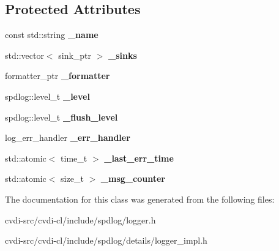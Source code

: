 \subsection*{Protected Attributes}
\begin{DoxyCompactItemize}
\item 
const std\+::string {\bfseries \+\_\+name}\hypertarget{classspdlog_1_1logger_a819e97be3b6e2066edb7798c04121749}{}\label{classspdlog_1_1logger_a819e97be3b6e2066edb7798c04121749}

\item 
std\+::vector$<$ sink\+\_\+ptr $>$ {\bfseries \+\_\+sinks}\hypertarget{classspdlog_1_1logger_aa3563923d7afee42f8ae19e5b1a6daea}{}\label{classspdlog_1_1logger_aa3563923d7afee42f8ae19e5b1a6daea}

\item 
formatter\+\_\+ptr {\bfseries \+\_\+formatter}\hypertarget{classspdlog_1_1logger_af3d364c4242d9071f9f7d48e437c373f}{}\label{classspdlog_1_1logger_af3d364c4242d9071f9f7d48e437c373f}

\item 
spdlog\+::level\+\_\+t {\bfseries \+\_\+level}\hypertarget{classspdlog_1_1logger_a89f596c2328f2ce5402c77eb8b181ab6}{}\label{classspdlog_1_1logger_a89f596c2328f2ce5402c77eb8b181ab6}

\item 
spdlog\+::level\+\_\+t {\bfseries \+\_\+flush\+\_\+level}\hypertarget{classspdlog_1_1logger_a53dcc290a397bd019756cfedf4d839d2}{}\label{classspdlog_1_1logger_a53dcc290a397bd019756cfedf4d839d2}

\item 
log\+\_\+err\+\_\+handler {\bfseries \+\_\+err\+\_\+handler}\hypertarget{classspdlog_1_1logger_a249eaef178568d6f7153e33118f8a9da}{}\label{classspdlog_1_1logger_a249eaef178568d6f7153e33118f8a9da}

\item 
std\+::atomic$<$ time\+\_\+t $>$ {\bfseries \+\_\+last\+\_\+err\+\_\+time}\hypertarget{classspdlog_1_1logger_a0b88740c53e5fc64ebebdbbd1640a4a6}{}\label{classspdlog_1_1logger_a0b88740c53e5fc64ebebdbbd1640a4a6}

\item 
std\+::atomic$<$ size\+\_\+t $>$ {\bfseries \+\_\+msg\+\_\+counter}\hypertarget{classspdlog_1_1logger_ab0f217552f160a7154a4398bcec65263}{}\label{classspdlog_1_1logger_ab0f217552f160a7154a4398bcec65263}

\end{DoxyCompactItemize}


The documentation for this class was generated from the following files\+:\begin{DoxyCompactItemize}
\item 
cvdi-\/src/cvdi-\/cl/include/spdlog/logger.\+h\item 
cvdi-\/src/cvdi-\/cl/include/spdlog/details/logger\+\_\+impl.\+h\end{DoxyCompactItemize}
